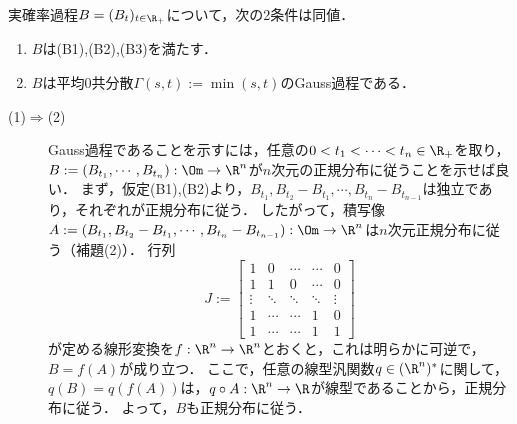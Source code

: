 \documentclass[uplatex,dvipdfmx]{jsreport}
\begin{document}
\begin{proposition}[Brown運動の特徴付け]
    実確率過程$B=(B_t)_{t\in\R_+}$について，次の2条件は同値．
    \begin{enumerate}
        \item $B$は(B1),(B2),(B3)を満たす．
        \item $B$は平均$0$共分散$\Gamma(s,t):=\min(s,t)$のGauss過程である．
    \end{enumerate}
\end{proposition}
\begin{Proof}\mbox{}
    \begin{description}
        \item[(1)$\Rightarrow$(2)] Gauss過程であることを示すには，任意の$0<t_1<\cdots<t_n\in\R_+$を取り，$B:=(B_{t_1},\cdots,B_{t_n}):\Om\to\R^n$が$n$次元の正規分布に従うことを示せば良い．
        まず，仮定(B1),(B2)より，$B_{t_1},B_{t_2}-B_{t_1},\cdots,B_{t_n}-B_{t_{n-1}}$は独立であり，それぞれが正規分布に従う．
        したがって，積写像$A:=(B_{t_1},B_{t_2}-B_{t_1},\cdots,B_{t_n}-B_{t_{n-1}}):\Om\to\R^n$は$n$次元正規分布に従う（補題(2)）．
        行列
        \[J:=\begin{bmatrix}1&0&\cdots&\cdots&0\\1&1&0&\cdots&0\\\vdots&\ddots&\ddots&\ddots&\vdots\\1&\cdots&\cdots&1&0\\1&\cdots&\cdots&1&1\end{bmatrix}\]
        が定める線形変換を$f:\R^n\to\R^n$とおくと，これは明らかに可逆で，$B=f(A)$が成り立つ．
        ここで，任意の線型汎関数$q\in(\R^n)^*$に関して，$q(B)=q(f(A))$は，$q\circ A:\R^n\to\R$が線型であることから，正規分布に従う．
        よって，$B$も正規分布に従う．


\end{description}
\end{Proof}
\end{document}
